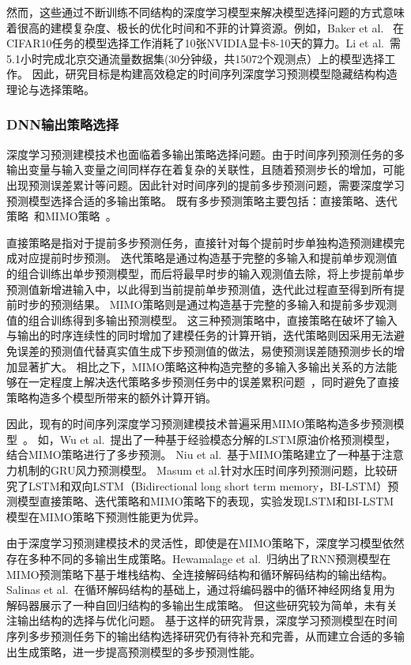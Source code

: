 然而，这些通过不断训练不同结构的深度学习模型来解决模型选择问题的方式意味着很高的建模复杂度、极长的优化时间和不菲的计算资源。例如，Baker et al.~
\cite{bakerDesigning2017}在CIFAR10任务的模型选择工作消耗了10张NVIDIA显卡8-10天的算力。Li et al.~\cite{liAutoST2020}需5.1小时完成北京交通流量数据集(30分钟级，共15072个观测点）上的模型选择工作。
因此，研究目标是构建高效稳定的时间序列深度学习预测模型隐藏结构构造理论与选择策略。

\subsubsection{DNN输出策略选择}
深度学习预测建模技术也面临着多输出策略选择问题。由于时间序列预测任务的多输出变量与输入变量之间同样存在着复杂的关联性，且随着预测步长的增加，可能出现预测误差累计等问题\cite{sorjamaaMethodology2007}。因此针对时间序列的提前多步预测问题，需要深度学习预测模型选择合适的多输出策略。
既有多步预测策略主要包括：直接策略、迭代策略~\cite{sorjamaaMethodology2007}和MIMO策略~\cite{bontempiLong2008}。

直接策略是指对于提前多步预测任务，直接针对每个提前时步单独构造预测建模完成对应提前时步预测。
迭代策略是通过构造基于完整的多输入和提前单步观测值的组合训练出单步预测模型，而后将最早时步的输入观测值去除，将上步提前单步预测值新增进输入中，以此得到当前提前单步预测值，迭代此过程直至得到所有提前时步的预测结果。
MIMO策略则是通过构造基于完整的多输入和提前多步观测值的组合训练得到多输出预测模型。
这三种预测策略中，直接策略在破坏了输入与输出的时序连续性的同时增加了建模任务的计算开销，迭代策略则因采用无法避免误差的预测值代替真实值生成下步预测值的做法，易使预测误差随预测步长的增加显著扩大。
相比之下，MIMO策略这种构造完整的多输入多输出关系的方法能够在一定程度上解决迭代策略多步预测任务中的误差累积问题~\cite{baoPSOMISMO2014}，同时避免了直接策略构造多个模型所带来的额外计算开销。

因此，现有的时间序列深度学习预测建模技术普遍采用MIMO策略构造多步预测模型~\cite{hewamalageRecurrent2021}。
如，Wu et al.~\cite{wuImproved2019}提出了一种基于经验模态分解的LSTM原油价格预测模型，结合MIMO策略进行了多步预测。
Niu et al.~\cite{niuWind2020}基于MIMO策略建立了一种基于注意力机制的GRU风力预测模型。
Masum et al.\cite{masumInvestigation2019}针对水压时间序列预测问题，比较研究了LSTM和双向LSTM（Bidirectional long short term memory，BI-LSTM）预测模型直接策略、迭代策略和MIMO策略下的表现，实验发现LSTM和BI-LSTM模型在MIMO策略下预测性能更为优异。

由于深度学习预测建模技术的灵活性，即使是在MIMO策略下，深度学习模型依然存在多种不同的多输出生成策略。Hewamalage et al.~\cite{hewamalageRecurrent2021}归纳出了RNN预测模型在MIMO预测策略下基于堆栈结构、全连接解码结构和循环解码结构的输出结构。Salinas et al.~\cite{salinasDeepAR2020}在循环解码结构的基础上，通过将编码器中的循环神经网络复用为解码器展示了一种自回归结构的多输出生成策略。
但这些研究较为简单，未有关注输出结构的选择与优化问题。
基于这样的研究背景，深度学习预测模型在时间序列多步预测任务下的输出结构选择研究仍有待补充和完善，从而建立合适的多输出生成策略，进一步提高预测模型的多步预测性能。


